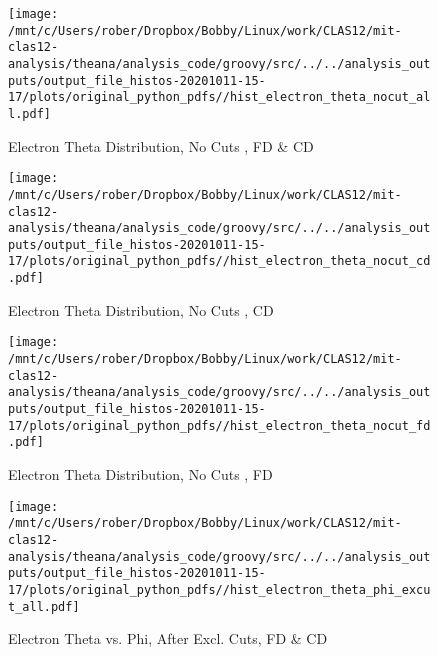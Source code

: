 \documentclass{article}
\begin{document}
\begin{landscape}
    \begin{figure}[h]
        \centering

        \texttt{[image: /mnt/c/Users/rober/Dropbox/Bobby/Linux/work/CLAS12/mit-clas12-analysis/theana/analysis\_code/groovy/src/../../analysis\_outputs/output\_file\_histos-20201011-15-17/plots/original\_python\_pdfs//hist\_electron\_theta\_nocut\_all.pdf]}
        \captionsetup{textformat=empty,labelformat=blank}
        \caption{Electron Theta Distribution, No Cuts , FD \& CD}
    \end{figure}
    \clearpage
    
    \begin{figure}[h]
        \centering

        \texttt{[image: /mnt/c/Users/rober/Dropbox/Bobby/Linux/work/CLAS12/mit-clas12-analysis/theana/analysis\_code/groovy/src/../../analysis\_outputs/output\_file\_histos-20201011-15-17/plots/original\_python\_pdfs//hist\_electron\_theta\_nocut\_cd.pdf]}
        \captionsetup{textformat=empty,labelformat=blank}
        \caption{Electron Theta Distribution, No Cuts , CD}
    \end{figure}
    \clearpage
    
    \begin{figure}[h]
        \centering

        \texttt{[image: /mnt/c/Users/rober/Dropbox/Bobby/Linux/work/CLAS12/mit-clas12-analysis/theana/analysis\_code/groovy/src/../../analysis\_outputs/output\_file\_histos-20201011-15-17/plots/original\_python\_pdfs//hist\_electron\_theta\_nocut\_fd.pdf]}
        \captionsetup{textformat=empty,labelformat=blank}
        \caption{Electron Theta Distribution, No Cuts , FD}
    \end{figure}
    \clearpage
    
    \begin{figure}[h]
        \centering

        \texttt{[image: /mnt/c/Users/rober/Dropbox/Bobby/Linux/work/CLAS12/mit-clas12-analysis/theana/analysis\_code/groovy/src/../../analysis\_outputs/output\_file\_histos-20201011-15-17/plots/original\_python\_pdfs//hist\_electron\_theta\_phi\_excut\_all.pdf]}
        \captionsetup{textformat=empty,labelformat=blank}
        \caption{Electron Theta vs. Phi, After Excl. Cuts, FD \& CD}
    \end{figure}
    \clearpage
    
    \begin{figure}[h]
        \centering


\end{figure}
\end{landscape}
\end{document}

